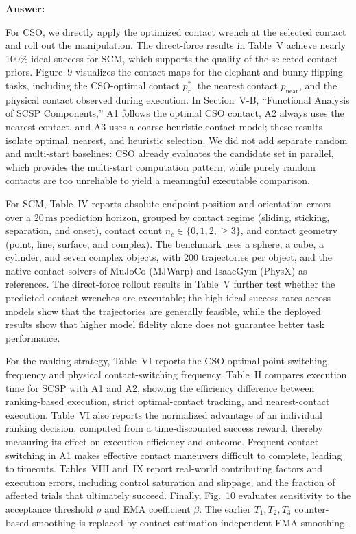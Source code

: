 \documentclass[journal,10pt]{IEEEtran}
\newcommand{\answer}{\par\smallskip\noindent\color{black}\textbf{Answer: }\ignorespaces
}
\begin{document}
\answer
For CSO, we directly apply the optimized contact wrench at the selected contact and roll out the manipulation. The direct-force results in Table~V achieve nearly 100\% ideal success for SCM, which supports the quality of the selected contact priors. Figure~9 visualizes the contact maps for the elephant and bunny flipping tasks, including the CSO-optimal contact $p_r^*$, the nearest contact $p_{\mathrm{near}}$, and the physical contact observed during execution. In Section~V-B, ``Functional Analysis of SCSP Components,'' A1 follows the optimal CSO contact, A2 always uses the nearest contact, and A3 uses a coarse heuristic contact model; these results isolate optimal, nearest, and heuristic selection. We did not add separate random and multi-start baselines: CSO already evaluates the candidate set in parallel, which provides the multi-start computation pattern, while purely random contacts are too unreliable to yield a meaningful executable comparison.

For SCM, Table~IV reports absolute endpoint position and orientation errors over a $20\,\mathrm{ms}$ prediction horizon, grouped by contact regime (sliding, sticking, separation, and onset), contact count $n_c\in\{0,1,2,\geq3\}$, and contact geometry (point, line, surface, and complex). The benchmark uses a sphere, a cube, a cylinder, and seven complex objects, with 200 trajectories per object, and the native contact solvers of MuJoCo (MJWarp) and IsaacGym (PhysX) as references. The direct-force rollout results in Table~V further test whether the predicted contact wrenches are executable; the high ideal success rates across models show that the trajectories are generally feasible, while the deployed results show that higher model fidelity alone does not guarantee better task performance.

For the ranking strategy, Table~VI reports the CSO-optimal-point switching frequency and physical contact-switching frequency. Table~II compares execution time for SCSP with A1 and A2, showing the efficiency difference between ranking-based execution, strict optimal-contact tracking, and nearest-contact execution. Table~VI also reports the normalized advantage of an individual ranking decision, computed from a time-discounted success reward, thereby measuring its effect on execution efficiency and outcome. Frequent contact switching in A1 makes effective contact maneuvers difficult to complete, leading to timeouts. Tables~VIII and~IX report real-world contributing factors and execution errors, including control saturation and slippage, and the fraction of affected trials that ultimately succeed. Finally, Fig.~10 evaluates sensitivity to the acceptance threshold $\bar{\rho}$ and EMA coefficient $\beta$. The earlier $T_1,T_2,T_3$ counter-based smoothing is replaced by contact-estimation-independent EMA smoothing.
\end{document}
